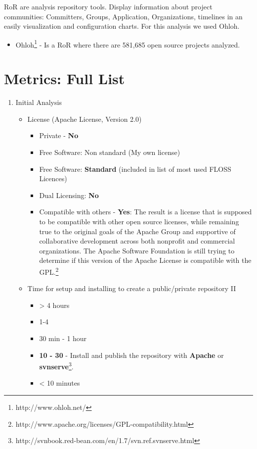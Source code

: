 \documentclass[11pt]{scrartcl}
\begin{document}
RoR are analysis repository tools. Display information about project communities: Committers, Groups, Application, Organizations, timelines in an easily visualization and configuration charts. For this analysis we used Ohloh.

\begin{itemize}
    \item Ohloh\footnote{http://www.ohloh.net/} - Is a RoR where there are 581,685 open source projects analyzed.
\end{itemize}

\section{Metrics: Full List}

\begin{enumerate}
    \item Initial Analysis
    \begin{itemize}
        \item License (Apache License, Version 2.0)
        \begin{itemize} 
            \item Private - \textbf{No}
            \item Free Software: Non standard (My own license)
            \item Free Software: \textbf{Standard} (included in list of most used FLOSS Licences)
            \item Dual Licensing: \textbf{No}
            \item Compatible with others - \textbf{Yes}: The result is a license that is supposed to be compatible with other open source licenses, while remaining true to the original goals of the Apache Group and supportive of collaborative development across both nonprofit and commercial organizations. The Apache Software Foundation is still trying to determine if this version of the Apache License is compatible with the GPL.\footnote{http://www.apache.org/licenses/GPL-compatibility.html}    
        \end{itemize}
	    \item Time for setup and installing to create a public/private repository II
        \begin{itemize}
            \item \textgreater
 4 hours
            \item 1-4 
            \item 30 min - 1 hour
            \item \textbf{10 - 30} - Install and publish the repository with \textbf{Apache} or \textbf{svnserve}\footnote{http://svnbook.red-bean.com/en/1.7/svn.ref.svnserve.html}.
            \item \textless
 10 minutes
        \end{itemize}
    \end{itemize}


\end{enumerate}
\end{document}
